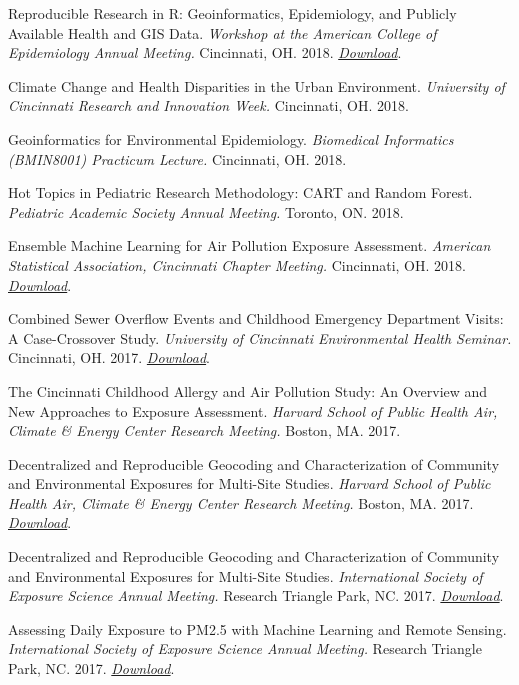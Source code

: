 Reproducible Research in R: Geoinformatics, Epidemiology, and Publicly
Available Health and GIS Data. \emph{Workshop at the American College of
Epidemiology Annual Meeting.} Cincinnati, OH. 2018.
\emph{\href{https://github.com/cole-brokamp/geoinformatics_and_population_health_in_R}{Download}}.

Climate Change and Health Disparities in the Urban Environment.
\emph{University of Cincinnati Research and Innovation Week.}
Cincinnati, OH. 2018.

Geoinformatics for Environmental Epidemiology. \emph{Biomedical
Informatics (BMIN8001) Practicum Lecture.} Cincinnati, OH. 2018.

Hot Topics in Pediatric Research Methodology: CART and Random Forest.
\emph{Pediatric Academic Society Annual Meeting.} Toronto, ON. 2018.

Ensemble Machine Learning for Air Pollution Exposure Assessment.
\emph{American Statistical Association, Cincinnati Chapter Meeting.}
Cincinnati, OH. 2018.
\emph{\href{https://colebrokamp-website.s3.amazonaws.com/talks/LURF_talk_20_FEB_2018.pdf}{Download}}.

Combined Sewer Overflow Events and Childhood Emergency Department
Visits: A Case-Crossover Study. \emph{University of Cincinnati
Environmental Health Seminar.} Cincinnati, OH. 2017.
\emph{\href{https://colebrokamp-website.s3.amazonaws.com/talks/cso_talk_30_November_2017.pdf}{Download}}.

The Cincinnati Childhood Allergy and Air Pollution Study: An Overview
and New Approaches to Exposure Assessment. \emph{Harvard School of
Public Health Air, Climate \& Energy Center Research Meeting.} Boston,
MA. 2017.

Decentralized and Reproducible Geocoding and Characterization of
Community and Environmental Exposures for Multi-Site Studies.
\emph{Harvard School of Public Health Air, Climate \& Energy Center
Research Meeting.} Boston, MA. 2017.
\emph{\href{https://colebrokamp-website.s3.amazonaws.com/talks/DeGAUSS_talk_13_NOV_2017.pdf}{Download}}.

Decentralized and Reproducible Geocoding and Characterization of
Community and Environmental Exposures for Multi-Site Studies.
\emph{International Society of Exposure Science Annual Meeting.}
Research Triangle Park, NC. 2017.
\emph{\href{https://colebrokamp-website.s3.amazonaws.com/talks/DeGAUSS_talk_ISES2017.pdf}{Download}}.

Assessing Daily Exposure to PM2.5 with Machine Learning and Remote
Sensing. \emph{International Society of Exposure Science Annual
Meeting.} Research Triangle Park, NC. 2017.
\emph{\href{https://colebrokamp-website.s3.amazonaws.com/talks/spatiotemporal_pm_model_talk_ISES2017.pdf}{Download}}.

